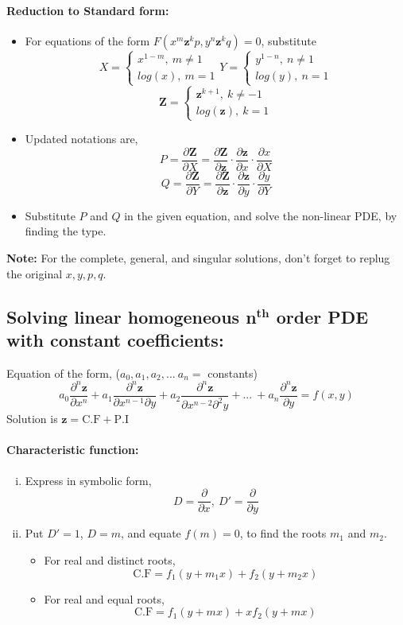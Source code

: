 \documentclass{article}
\begin{document}
{\paragraph{\Large Reduction to Standard form:}
\begin{itemize}
\item For equations of the form {\LARGE $F(x^m\textbf{z}^kp,y^n\textbf{z}^kq)=0$}, substitute
{\LARGE $$X=\begin{cases}
x^{1-m},\ m\neq 1\\
log(x),\ m=1
\end{cases} Y=\begin{cases}
y^{1-n},\ n\neq 1\\
log(y),\ n=1
\end{cases}$$ $$\textbf{Z}=\begin{cases}
\textbf{z}^{k+1},\ k\neq -1\\
log(\textbf{z}),\ k=1
\end{cases}$$}
\item Updated notations are,
{\LARGE $$P=\frac{\partial \textbf{Z}}{\partial X}=\frac{\partial \textbf{Z}}{\partial \textbf{z}}\cdot\frac{\partial \textbf{z}}{\partial x}\cdot \frac{\partial x}{\partial X}$$ $$Q=\frac{\partial \textbf{Z}}{\partial Y}=\frac{\partial \textbf{Z}}{\partial \textbf{z}}\cdot\frac{\partial \textbf{z}}{\partial y}\cdot \frac{\partial y}{\partial Y}$$}
\item Substitute $P$ and $Q$ in the given equation, and solve the non-linear PDE, by finding the type.
\end{itemize}
\textbf{Note:} For the complete, general, and singular solutions, don't forget to replug the original $x,y,p,q$.
\subsection{\LARGE Solving linear homogeneous n$\mathrm{^{\textbf{th}}}$ order PDE with constant coefficients:}
Equation of the form, ({\LARGE $a_0,a_1,a_2,...\ a_n=$} constants)
{\LARGE $$a_0\frac{\partial^n \textbf{z}}{\partial x^n}+a_1\frac{\partial^n \textbf{z}}{\partial x^{n-1}\partial y}+a_2\frac{\partial^n \textbf{z}}{\partial x^{n-2}\partial^2 y}+...\ +a_n\frac{\partial^n \textbf{z}}{\partial y}=f(x,y)$$}
Solution is $\textbf{z}=\mathrm{C.F+P.I}$
\paragraph{{\Large Characteristic function:}}
\begin{enumerate}[(i)]
\item Express in symbolic form,
{\LARGE $$D=\frac{\partial}{\partial x},\ D'=\frac{\partial}{\partial y}$$}
\item Put $D'=1$, $D=m$, and equate {\LARGE $f(m)=0$}, to find the roots $m_1$ and $m_2$.
\newpage
\begin{itemize}
\item For real and distinct roots, {\LARGE $$\mathrm{C.F}=f_1(y+m_1x)+f_2(y+m_2x)$$}
\item For real and equal roots, {\LARGE $$\mathrm{C.F}=f_1(y+mx)+xf_2(y+mx)$$}
\end{itemize}
\end{enumerate}
}
\end{document}
